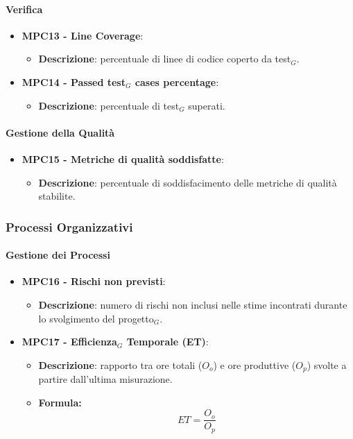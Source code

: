 \documentclass[10pt]{article}
\begin{document}
\begin{justify}
\paragraph{Verifica}
\begin{itemize}
    \item \textbf{MPC13 - Line Coverage}:
    \begin{itemize}
        \item \textbf{Descrizione}: percentuale di linee di codice coperto da test$_G$.
    \end{itemize}
    \item \textbf{MPC14 - Passed test$_G$ cases percentage}:
        \begin{itemize}
            \item \textbf{Descrizione}: percentuale di test$_G$ superati.
        \end{itemize}
\end{itemize}

\paragraph{Gestione della Qualità}
\begin{itemize}
 \item \textbf{MPC15 - Metriche di qualità soddisfatte}:
    \begin{itemize}
        \item \textbf{Descrizione}: percentuale di soddisfacimento delle metriche di qualità stabilite.
    \end{itemize}
\end{itemize}

\subsubsection{Processi Organizzativi}
\paragraph{Gestione dei Processi}
\begin{itemize}
    \item \textbf{MPC16 - Rischi non previsti}:
        \begin{itemize}
            \item \textbf{Descrizione}: numero di rischi non inclusi nelle stime incontrati durante lo svolgimento del progetto$_G$.
        \end{itemize}
    \item \textbf{MPC17 - Efficienza$_G$ Temporale (ET)}:
    \begin{itemize}
        \item   \textbf{Descrizione}: rapporto tra ore totali ($O_o$) e ore produttive ($O_p$) svolte a partire dall'ultima misurazione.
        \item   \textbf{Formula:}
            \[
            ET = \frac{O_o}{O_p}
            \]
    \end{itemize}
\end{itemize}

\end{justify}
\end{document}
